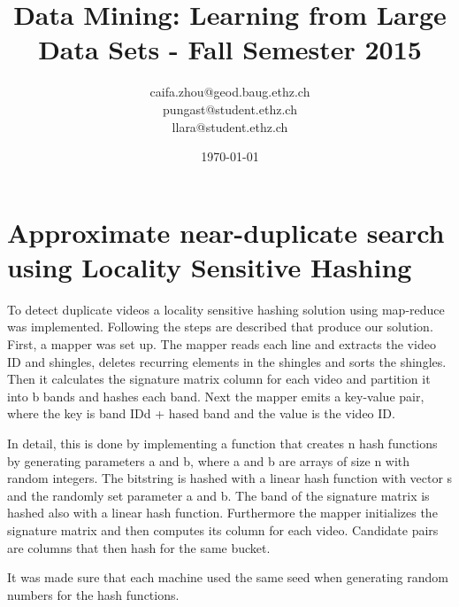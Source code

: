 \documentclass[a4paper, 11pt]{article}
\title{Data Mining: Learning from Large Data Sets - Fall Semester 2015}
\author{caifa.zhou@geod.baug.ethz.ch\\ pungast@student.ethz.ch\\ llara@student.ethz.ch\\}
\date{\today}
\begin{document}
\maketitle

\section*{Approximate near-duplicate search using Locality Sensitive Hashing} 

To detect duplicate videos a locality sensitive hashing solution using map-reduce was implemented.
Following the steps are described that produce our solution. \newline First, a mapper was set up. The mapper reads each line and extracts the video ID and shingles, deletes recurring elements in the shingles and sorts the shingles. Then it calculates the signature matrix column for each video and partition it into b bands and hashes each band. Next the mapper emits a key-value pair, where the key is band IDd + hased band and the value is the video ID. 

In detail, this is done by implementing a function that creates n hash functions by generating parameters a and b, where a and b are arrays of size n with random integers. The bitstring is hashed with a linear hash function with vector s and the randomly set parameter a and b. The band of the signature matrix is hashed also with a linear hash function. Furthermore the mapper initializes the signature matrix and then computes its column for each video. Candidate pairs are columns that then hash for the same bucket.  

It was made sure that each machine used the same seed when generating random numbers for the hash functions.
\end{document}

